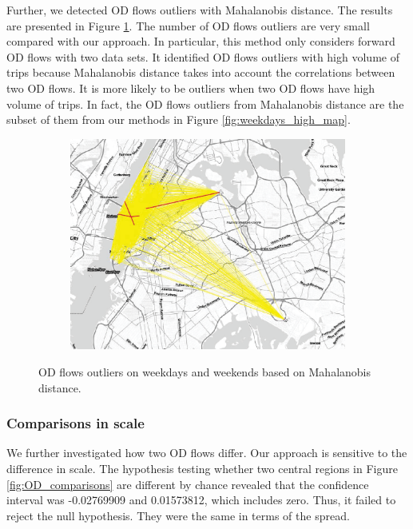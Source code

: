 \documentclass[a4paper,UKenglish]{lipics-v2016}
\providecommand{\DIFaddbeginFL}{} %
\providecommand{\DIFaddendFL}{} %
\providecommand{\DIFdelbeginFL}{} %
\providecommand{\DIFdelendFL}{} %
\begin{document}
Further, we detected OD flows outliers with Mahalanobis distance. The results are presented in Figure \ref{fig:week_ends_MD}. The number of OD flows outliers are very small compared with our approach. In particular, this method only considers forward OD flows with two data sets. It identified OD flows outliers with high volume of trips  because Mahalanobis distance takes into account the correlations between two OD flows. It is more likely to be outliers when two OD flows have high volume of trips. In fact, the OD flows outliers from Mahalanobis distance are the subset of them from our methods in Figure \ref{fig:weekdays_high_map}. 

\begin{figure}
	\centering
	\begin{subfigure}[b]{0.49\textwidth}
		\DIFdelbeginFL %
\DIFdelendFL \DIFaddbeginFL \includegraphics[width=\textwidth]{images/out_weekdays_weekends_md2_outlier.eps}
	\DIFaddendFL \end{subfigure}
	\caption{OD flows outliers on weekdays and weekends based on Mahalanobis distance. }\label{fig:week_ends_MD}	
\end{figure}

\subsubsection{Comparisons in scale}
We further investigated how two OD flows differ. Our approach is sensitive to the difference in scale. The hypothesis testing whether two central regions in Figure \ref{fig:OD_comparisons} are different by chance revealed that the confidence interval was -0.02769909 and 0.01573812, which includes zero. Thus, it failed to reject the null hypothesis. They were the same in terms of the spread.  
\end{document}
